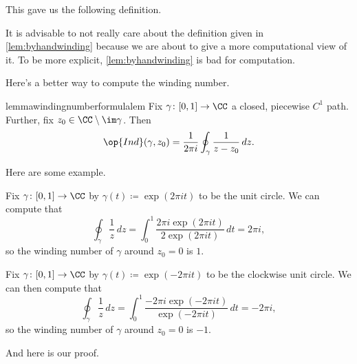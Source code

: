 This gave us the following definition.
\windingnumberdef*
\begin{remark}
	It is advisable to not really care about the definition given in \autoref{lem:byhandwinding} because we are about to give a more computational view of it. To be more explicit, \autoref{lem:byhandwinding} is bad for computation.
\end{remark}
Here's a better way to compute the winding number.
\begin{restatable}{lemma}{windingnumberformulalem} \label{lem:betterwinding}
	Fix $\gamma\colon [0,1]\to\CC$ a closed, piecewise $C^1$ path. Further, fix $z_0\in\CC\setminus\im\gamma$. Then
	\[\op{Ind}(\gamma,z_0)=\frac1{2\pi i}\oint_\gamma\frac1{z-z_0}\,dz.\]
\end{restatable}
\noindent Here are some example.
\begin{example}
	Fix $\gamma\colon [0,1]\to\CC$ by $\gamma(t)\coloneqq \exp(2\pi it)$ to be the unit circle. We can compute that
	\[\oint_\gamma\frac1z\,dz=\int_0^1\frac{2\pi i\exp(2\pi it)}{2\exp(2\pi it)}\,dt=2\pi i,\]
	so the winding number of $\gamma$ around $z_0=0$ is $1$.
\end{example}
\begin{example}
	Fix $\gamma\colon [0,1]\to\CC$ by $\gamma(t)\coloneqq \exp(-2\pi it)$ to be the clockwise unit circle. We can then compute that
	\[\oint_\gamma\frac1z\,dz=\int_0^1\frac{-2\pi i\exp(-2\pi it)}{\exp(-2\pi it)}\,dt=-2\pi i,\]
	so the winding number of $\gamma$ around $z_0=0$ is $-1$.
\end{example}
And here is our proof.
